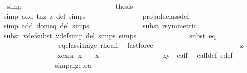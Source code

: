 \begin{isabellebody}
\ simp\isanewline
\ \ \ \ \ \ \ \ \ \ \ \ \isamarkupfalse%
\isanewline
\ \ \ \ \ \ \ \ \ \ \ \ \isamarkupfalse%
\ {\isacharquery}thesis\isanewline
\ \ \ \ \ \ \ \ \ \ \ \ \ \ \isamarkupfalse%
\ {}\ \isamarkupfalse%
{\isacharparenleft}simp\ add{\isacharcolon}\ t{\isacharunderscore}nz\ z{}\ del{\isacharcolon}\ {\isasymtau}{\isachardot}simps{\isacharparenright}\isanewline
\ \ \ \ \ \ \ \ \ \ \ \ \ \ \isamarkupfalse%
\ proj{\isacharunderscore}add{\isacharunderscore}class{\isacharunderscore}def\ \isamarkupfalse%
{\isacharparenleft}simp\ add{\isacharcolon}\ dom{\isacharunderscore}eq\ del{\isacharcolon}\ {\isasymtau}{\isachardot}simps{\isacharparenright}\isanewline
\ \ \ \ \ \ \ \ \ \ \ \ \ \ \isamarkupfalse%
{\isacharparenleft}subst\ z{}{\isacharbrackleft}symmetric{\isacharbrackright}{\isacharparenright}{\isacharplus}\isanewline
\ \ \ \ \ \ \ \ \ \ \ \ \ \ \isamarkupfalse%
{\isacharparenleft}subst\ v{}{\isacharunderscore}def{\isacharcomma}subst\ v{}{\isacharunderscore}def{\isacharcomma}simp\ del{\isacharcolon}\ {\isasymtau}{\isachardot}simps\ {\isasymrho}{\isachardot}simps{\isacharparenright}\isanewline
\ \ \ \ \ \ \ \ \ \ \ \ \ \ \isamarkupfalse%
{\isacharparenleft}subst\ eq{\isacharparenright}\ \ \ \isanewline
\ \ \ \ \ \ \ \ \ \ \ \ \ \ \isamarkupfalse%
\ eq{\isacharunderscore}class{\isacharunderscore}image\ rho{\isacharunderscore}aff\ \isamarkupfalse%
\ fastforce\isanewline
\ \ \ \ \ \ \ \ \ \ \isamarkupfalse%
\isanewline
\ \ \ \ \ \ \ \ \ \ \ \ \isamarkupfalse%
\ z{}\isanewline
\ \ \ \ \ \ \ \ \ \ \ \ \isamarkupfalse%
\ \isamarkupfalse%
\ x{\isacharunderscore}expr{\isacharcolon}\ {\isachardoublequoteopen}x\ {\isacharequal}\ {}\ {\isasymor}\ x\ {\isacharequal}\ {\isacharminus}{}{\isachardoublequoteclose}\isanewline
\ \ \ \ \ \ \ \ \ \ \ \ \ \ \isamarkupfalse%
\ {\isacartoucheopen}{\isacharparenleft}x{\isacharcomma}y{\isacharparenright}\ {\isasymin}\ e{\isacharunderscore}aff{\isacartoucheclose}\ \isamarkupfalse%
\ e{\isacharunderscore}aff{\isacharunderscore}def\ e{\isacharprime}{\isacharunderscore}def\ \isanewline
\ \ \ \ \ \ \ \ \ \ \ \ \ \ \isamarkupfalse%
{\isacharparenleft}simp{\isacharcomma}algebra{\isacharparenright}\isanewline
\ \ \ \ \ \ \ \ \ \ \ \ \isamarkupfalse%

\end{isabellebody}

